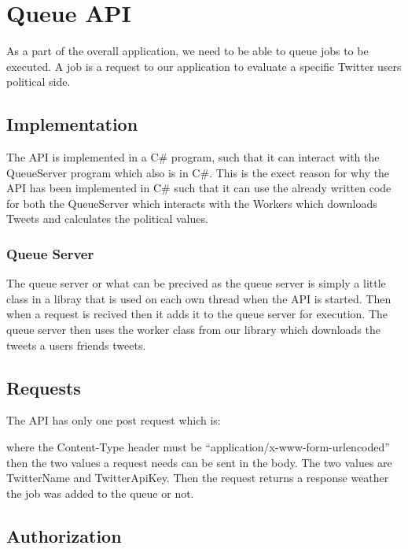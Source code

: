 \chapter{Queue \ac{API}}
As a part of the overall application, we need to be able to queue jobs to be
executed. A job is a request to our application to evaluate a specific Twitter
users political side.

\section{Implementation}
The \ac{API} is implemented in a C\# program, such that it can interact with the
QueueServer program which also is in C\#. This is the exect reason for why the
\ac{API} has been implemented in C\# such that it can use the already written
code for both the QueueServer which interacts with the Workers which downloads
Tweets and calculates the political values.

\subsection{Queue Server}
The queue server or what can be precived as the queue server is simply a little
class in a libray that is used on each own thread when the \ac{API} is started. 
Then when a request is recived then it adds it to the queue server for
execution. The queue server then uses the worker class from our library which
downloads the tweets a users friends tweets. 


\section{Requests}
The \ac{API} has only one post request which is: \nl

\nl

where the Content-Type header must be ``application/x-www-form-urlencoded''
then the two values a request needs can be sent in the body. The two values are
TwitterName and TwitterApiKey.
Then the request returns a response weather the job was added to the queue or
not.

\section{Authorization}



